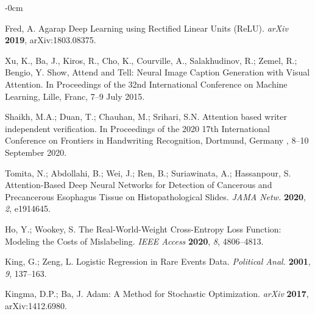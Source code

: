 \documentclass[sensors,article,accept,pdftex,moreauthors]{Definitions/mdpi}
\begin{document}
\begin{adjustwidth}{-\extralength}{0cm}
\begin{thebibliography}{999}
Fred, A. Agarap Deep Learning using Rectified Linear Units (ReLU).
{\em arXiv} 
{\bf 2019}, arXiv:1803.08375.

Xu, K., Ba, J., Kiros, R., Cho, K., Courville, A., Salakhudinov, R.; Zemel, R.; Bengio, Y. Show, Attend and Tell: Neural Image Caption Generation with Visual Attention. In Proceedings of the 32nd International Conference on Machine Learning, Lille, Franc, 7--9 July 2015.

Shaikh, M.A.; Duan, T.; Chauhan, M.; Srihari, S.N. {Attention} %
 based writer independent verification. In Proceedings of the 2020 17th International Conference on Frontiers in Handwriting Recognition,  Dortmund, Germany , 8--10 September
{2020}.

Tomita, N.; Abdollahi, B.; Wei, J.; Ren, B.; Suriawinata, A.; Hassanpour, S. Attention-Based Deep Neural Networks for Detection of Cancerous and Precancerous Esophagus Tissue on Histopathological Slides.
{\em JAMA Netw.} 
{\bf 2020}, \emph{2}, e1914645.

Ho, Y.; Wookey, S. The Real-World-Weight Cross-Entropy Loss Function: Modeling the Costs of Mislabeling.
\emph{IEEE Access }
{\bf 2020}, \emph{8}, 4806--4813.

King, G.; Zeng, L. Logistic Regression in Rare Events Data.
{\em Political Anal.} 
{\bf 2001}, \emph{9}, 137--163.

Kingma, D.P.; Ba, J. Adam: A Method for Stochastic Optimization.
{\em arXiv} 
{\bf 2017}, arXiv:1412.6980.


		\end{thebibliography}
		
		

\end{adjustwidth}
\end{document}
